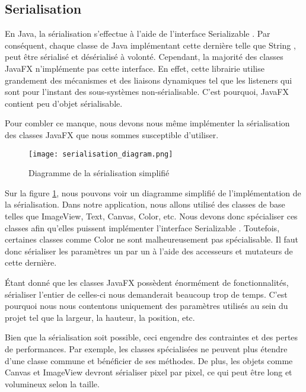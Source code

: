 \subsection{Serialisation}
\label{sec:serialisation}
En Java, la sérialisation s'effectue à l'aide de l'interface \og Serializable \fg{}. Par conséquent, chaque classe de Java implémentant cette dernière telle que \og String \fg{}, peut être sérialisé et désérialisé à volonté. Cependant, la majorité des classes JavaFX n'implémente pas cette interface. En effet, cette librairie utilise grandement des mécanismes et des liaisons dynamiques tel que les listeners qui sont pour l'instant des sous-systèmes non-sérialisable. C'est pourquoi, JavaFX contient peu d'objet sérialisable.

Pour combler ce manque, nous devons nous même implémenter la sérialisation des classes JavaFX que nous sommes susceptible d'utiliser.

\begin{figure}[h]
    \caption{Diagramme de la sérialisation simplifié}
    \centering
    \texttt{[image: serialisation\_diagram.png]}
    \label{fig:seri_diag}
\end{figure}

Sur la figure \ref{fig:seri_diag}, nous pouvons voir un diagramme simplifié de l'implémentation de la sérialisation. Dans notre application, nous allons utilisé des classes de base telles que ImageView, Text, Canvas, Color, etc. Nous devons donc spécialiser ces classes afin qu'elles puissent implémenter l'interface \og Serializable \fg{}. Toutefois, certaines classes comme \og Color \fg{} ne sont malheureusement pas spécialisable. Il faut donc sérialiser les paramètres un par un à l'aide des accesseurs et mutateurs de cette dernière.

Étant donné que les classes JavaFX possèdent énormément de fonctionnalités, sérialiser l'entier de celles-ci nous demanderait beaucoup trop de temps. C'est pourquoi nous nous contentons uniquement des paramètres utilisés au sein du projet tel que la largeur, la hauteur, la position, etc.



Bien que la sérialisation soit possible, ceci engendre des contraintes et des pertes de performances. Par exemple, les classes spécialisées ne peuvent plus étendre d'une classe commune et bénéficier de ses méthodes. De plus, les objets comme Canvas et ImageView devront sérialiser pixel par pixel, ce qui peut être long et volumineux selon la taille.

